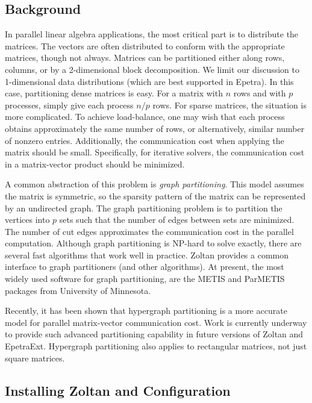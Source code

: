 \subsection{Background}
In parallel linear algebra applications, the most critical part is to 
distribute the matrices. The vectors are often distributed to conform
with the appropriate matrices, though not always. Matrices can
be partitioned either along rows, columns, or by a 2-dimensional
block decomposition. We limit our discussion to 1-dimensional data
distributions (which are best supported in Epetra). In this case, 
partitioning dense matrices is easy.
For a matrix with $n$ rows and with $p$ processes, simply give
each process $n/p$  rows. For sparse matrices, the situation
is more complicated. To achieve load-balance, one may wish 
that each process obtains approximately the same number of rows,
or alternatively, similar number of nonzero entries. 
Additionally, the communication cost when applying the matrix
should be small. Specifically, for iterative solvers, the
communication cost in a matrix-vector product should be minimized.

A common abstraction of this problem is \emph{graph partitioning}.
This model assumes the matrix is symmetric, so the sparsity 
pattern of the matrix can be represented by an undirected graph.
The graph partitioning problem is to partition the
vertices into $p$ sets such that the number of edges between
sets are minimized. The number of cut edges approximates the
communication cost in the parallel computation. Although 
graph partitioning is NP-hard to solve exactly, there are
several fast algorithms that work well in practice. Zoltan
provides a common interface to graph partitioners (and other algorithms).
At present, the most widely used software for graph partitioning,
are the METIS and ParMETIS \cite{Metis,KarypisK99} packages from University 
of Minnesota.

Recently, it has been shown \cite{CatAyk99} that hypergraph partitioning 
is a more accurate model for parallel matrix-vector communication cost.
Work is currently underway to provide such advanced partitioning capability
in future versions of Zoltan and EpetraExt. Hypergraph partitioning
also applies to rectangular matrices, not just square matrices.

\subsection{Installing Zoltan and Configuration}

